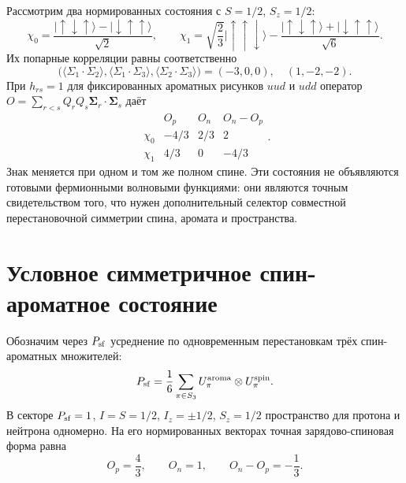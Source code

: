 Рассмотрим два нормированных состояния с $S=1/2$, $S_z=1/2$:
\begin{equation}
 \chi_0=\frac{|\uparrow\downarrow\uparrow\rangle
 -|\downarrow\uparrow\uparrow\rangle}{\sqrt2},
 \qquad
 \chi_1=\sqrt{\frac23}|\uparrow\uparrow\downarrow\rangle
 -\frac{|\uparrow\downarrow\uparrow\rangle
 +|\downarrow\uparrow\uparrow\rangle}{\sqrt6}.
 \label{eq:v8-baryon-em-two-spin-half-couplings}
\end{equation}
Их попарные корреляции равны соответственно
\begin{equation}
 \bigl(\langle\Sigma_1\!\cdot\!\Sigma_2\rangle,
 \langle\Sigma_1\!\cdot\!\Sigma_3\rangle,
 \langle\Sigma_2\!\cdot\!\Sigma_3\rangle\bigr)
 =(-3,0,0),\quad(1,-2,-2).
 \label{eq:v8-baryon-em-spin-half-pair-correlations}
\end{equation}
При $h_{rs}=1$ для фиксированных ароматных рисунков $uud$ и $udd$
оператор
$O=\sum_{r<s}Q_rQ_s\boldsymbol\Sigma_r\cdot\boldsymbol\Sigma_s$
даёт
\begin{equation}
 \begin{array}{c|cc|c}
  &O_p&O_n&O_n-O_p\\ \hline
  \chi_0&-4/3&2/3&2\\
  \chi_1& 4/3&0&-4/3
 \end{array}.
 \label{eq:v8-baryon-em-spin-coupling-sign-countermodels}
\end{equation}
Знак меняется при одном и том же полном спине. Эти состояния не объявляются
готовыми фермионными волновыми функциями: они являются точным
свидетельством того, что нужен дополнительный селектор совместной
перестановочной симметрии спина, аромата и пространства.

\section{Условное симметричное спин-ароматное состояние}

Обозначим через $P_{\rm sf}$ усреднение по одновременным перестановкам
трёх спин-ароматных множителей:
\begin{equation}
 P_{\rm sf}=\frac1{6}\sum_{\pi\in S_3}U_\pi^{\rm aroma}
 \otimes U_\pi^{\rm spin}.
 \label{eq:v8-baryon-em-spin-flavor-symmetrizer}
\end{equation}
В секторе $P_{\rm sf}=1$, $I=S=1/2$, $I_z=\pm1/2$, $S_z=1/2$
пространство для протона и нейтрона одномерно. На его нормированных
векторах точная зарядово-спиновая форма равна
\begin{equation}
 O_p=\frac43,
 \qquad
 O_n=1,
 \qquad
 O_n-O_p=-\frac13.
 \label{eq:v8-baryon-em-symmetric-spin-flavor-magnetic-values}
\end{equation}

